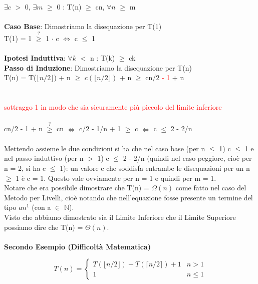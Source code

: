 \documentclass[../cheatSheetAlgoritmi.tex]{subfiles}
\begin{document}
$\exists c$ $>$ 0, $\exists m$ $\geq$ 0 : T(n) $\geq$ cn, $\forall n$ $\geq$ m\\\\
\textbf{Caso Base}: Dimostriamo la disequazione per T(1)\\
T(1) = 1 $\stackrel{?}{\geq}$ 1 $\cdot$ c $\iff$ c $\leq$ 1\\\\
\textbf{Ipotesi Induttiva}: $\forall k$ $<$ n : T(k) $\geq$ ck\\
\textbf{Passo di Induzione}: Dimostriamo la disequazione per T(n)\\
T(n) =  T($\lfloor n/2 \rfloor$) + n $\geq$ $c( \lfloor n/2 \rfloor)$ + n $\geq$ cn/2 \textcolor{red}{- 1} + n\\\\\\
\textcolor{red}{sottraggo 1 in modo che sia sicuramente più piccolo del limite inferiore} \\\\
cn/2 - 1 + n $\stackrel{?}{\geq}$ cn $\iff$ c/2 - 1/n + 1 $\geq$ c $\iff$ c $\leq$ 2 - 2/n\\\\
Mettendo assieme le due condizioni si ha che nel caso base (per n $\leq$ 1) c $\leq$ 1 e nel passo induttivo (per n $>$ 1) c $\leq$ 2 - 2/n (quindi nel caso peggiore, cioè per n = 2, si ha c $\leq$ 1): un valore c che soddisfa entrambe le disequazioni per un n $\geq$ 1 è c = 1. Questo vale ovviamente per n = 1 e quindi per m = 1.\\
Notare che era possibile dimostrare che T(n) = $\Omega(n)$ come fatto nel caso del Metodo per Livelli, cioè notando che nell'equazione fosse presente un termine del tipo  $an^{1}$ (con a $\in$ $\mathbb{N}$).\\
Visto che abbiamo dimostrato sia il Limite Inferiore che il Limite Superiore possiamo dire che T(n) = $\Theta(n)$.\\\\
\textbf{Secondo Esempio (Difficoltà Matematica)}
\begin{center}
	\begin{equation*}
  		T(n)=\begin{cases}
    		T(\lfloor n/2 \rfloor) + T(\lceil n/2 \rceil) + 1 & \text{$n > 1$}\\
    		1 & \text{$n \leq 1$}
  		\end{cases}
	\end{equation*}
\end{center}
\hfill\\
\end{document}
